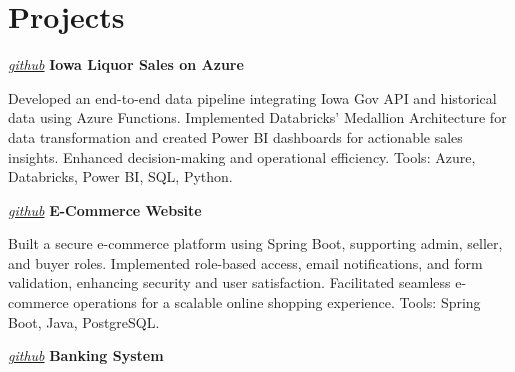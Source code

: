 \section{Projects}

\begin{twocolentry}{
    \textit{\href{https://github.com/arahman6/iowa-liquor-pipeline}{github}}}
    \textbf{Iowa Liquor Sales on Azure}
\end{twocolentry}

\vspace{0.10 cm}
\begin{onecolentry}
    \begin{highlights}
        \item Developed an end-to-end data pipeline integrating Iowa Gov API and historical data using Azure Functions. Implemented Databricks' Medallion Architecture for data transformation and created Power BI dashboards for actionable sales insights. Enhanced decision-making and operational efficiency. Tools: Azure, Databricks, Power BI, SQL, Python.
    \end{highlights}
\end{onecolentry}

\vspace{0.2 cm}

\begin{twocolentry}{
    \textit{\href{https://github.com/arahman6/waa-project-202406-backend}{github}}}
    \textbf{E-Commerce Website}
\end{twocolentry}

\vspace{0.10 cm}
\begin{onecolentry}
    \begin{highlights}
        \item Built a secure e-commerce platform using Spring Boot, supporting admin, seller, and buyer roles. Implemented role-based access, email notifications, and form validation, enhancing security and user satisfaction. Facilitated seamless e-commerce operations for a scalable online shopping experience. Tools: Spring Boot, Java, PostgreSQL.
    \end{highlights}
\end{onecolentry}

\vspace{0.2 cm}

\begin{twocolentry}{
    \textit{\href{https://github.com/vedthemaster/ASD-FinalProject}{github}}}
    \textbf{Banking System}
\end{twocolentry}

